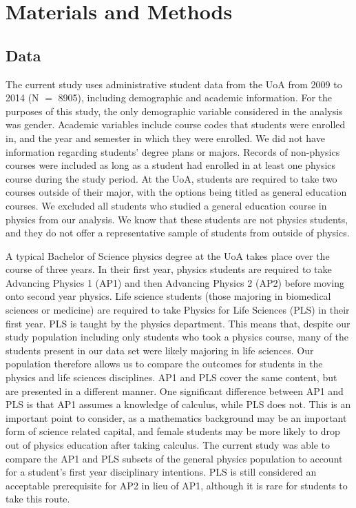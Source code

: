 \section{Materials and Methods}

\subsection{Data}
The current study uses administrative student data from the UoA from 2009 to 2014 (N $=$ 8905), including demographic and academic information. For the purposes of this study, the only demographic variable considered in the analysis was gender. Academic variables include course codes that students were enrolled in, and the year and semester in which they were enrolled. We did not have information regarding students' degree plans or majors. Records of non-physics courses were included as long as a student had enrolled in at least one physics course during the study period. At the UoA, students are required to take two courses outside of their major, with the options being titled as general education courses. We excluded all students who studied a general education course in physics from our analysis. We know that these students are not physics students, and they do not offer a representative sample of students from outside of physics.

A typical Bachelor of Science physics degree at the UoA takes place over the course of three years. In their first year, physics students are required to take Advancing Physics 1 (AP1) and then Advancing Physics 2 (AP2) before moving onto second year physics. Life science students (those majoring in biomedical sciences or medicine) are required to take Physics for Life Sciences (PLS) in their first year. PLS is taught by the physics department. This means that, despite our study population including only students who took a physics course, many of the students present in our data set were likely majoring in life sciences. Our population therefore allows us to compare the outcomes for students in the physics and life sciences disciplines. AP1 and PLS cover the same content, but are presented in a different manner. One significant difference between AP1 and PLS is that AP1 assumes a knowledge of calculus, while PLS does not. This is an important point to consider, as a mathematics background may be an important form of science related capital\cite{Black2016}, and female students may be more likely to drop out of physics education after taking calculus.\cite{Ellis_2016} The current study was able to compare the AP1 and PLS subsets of the general physics population to account for a student's first year disciplinary intentions. PLS is still considered an acceptable prerequisite for AP2 in lieu of AP1, although it is rare for students to take this route. 


